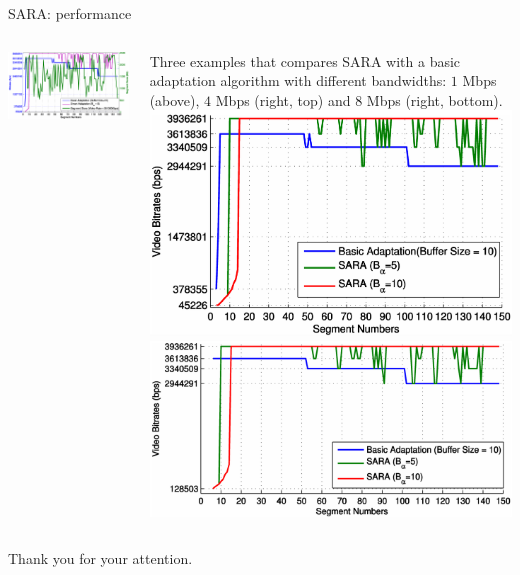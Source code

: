 \documentclass[10pt]{beamer}
\begin{document}
\begin{frame}[fragile]{SARA: performance}
	\begin{columns}
        	\centering
            \includegraphics[width=\textwidth]{img/sara_basic_segment}
            \vspace*{0.5cm}
            
            \raggedright Three examples that compares SARA with a basic adaptation algorithm with different bandwidths: $1$ Mbps (above), $4$ Mbps (right, top) and $8$ Mbps (right, bottom).
        	\centering
            \includegraphics[width=\textwidth]{img/sara_basic_4m}
            \vspace*{0.5cm}
            \includegraphics[width=\textwidth]{img/sara_basic_8m}
\end{columns}
\end{frame}

\begin{frame}[fragile]{}
Thank you for your attention.
\end{frame}
\end{document}
